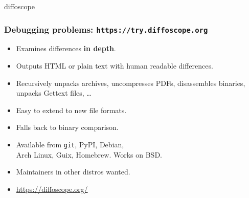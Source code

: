 \documentclass[14pt,aspectratio=169]{beamer}
\newif\ifplacelogo
\begin{document}
\placelogofalse

{

\begin{frame}{diffoscope}
 \frametitle{Debugging problems: \texttt{https://try.diffoscope.org}}

 \begin{itemize}
  \item Examines differences \textbf{in depth}.
  \item Outputs HTML or plain text with human readable differences.
  \item Recursively unpacks archives, uncompresses PDFs, disassembles
  binaries, unpacks Gettext files, …
  \item Easy to extend to new file formats.
  \item Falls back to binary comparison.
  \item Available from \texttt{git}, PyPI, Debian, \\
   Arch Linux, Guix, Homebrew. Works on BSD.
  \item Maintainers in other distros wanted.
  \item \url{https://diffoscope.org/}
 \end{itemize}
\end{frame}


}
\end{document}
